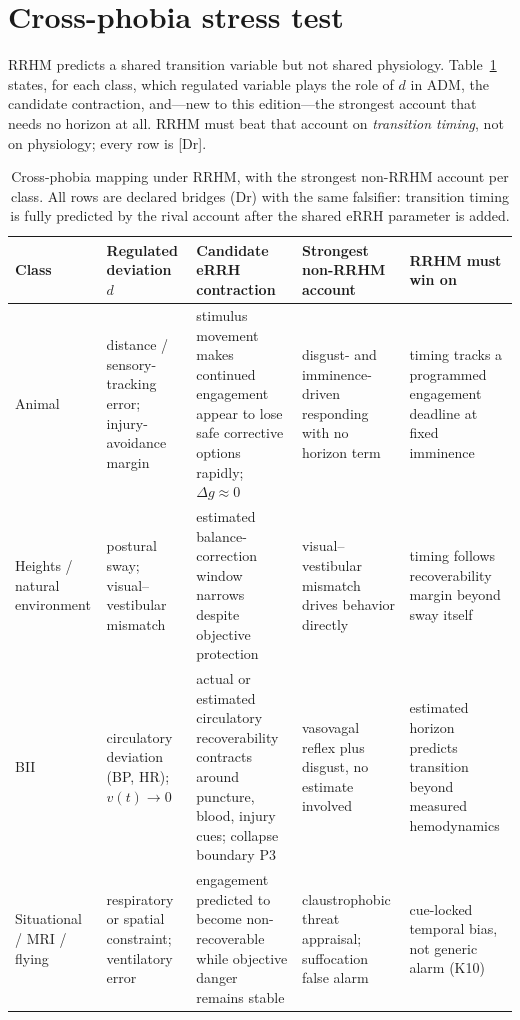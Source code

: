 \documentclass[9pt,twocolumn]{article}
\newcommand{\tier}[1]{{\sffamily\scriptsize\color{RRHMSlate}[#1]}}
\begin{document}
\section{Cross-phobia stress test}
RRHM predicts a shared transition variable but not shared physiology. Table~\ref{tab:cross} states, for each class, which regulated variable plays the role of $d$ in ADM, the candidate contraction, and---new to this edition---the strongest account that needs no horizon at all. RRHM must beat that account on \emph{transition timing}, not on physiology; every row is \tier{Dr}.

\begin{table}[!t]
\centering
\caption{Cross-phobia mapping under RRHM, with the strongest non-RRHM account per class. All rows are declared bridges (Dr) with the same falsifier: transition timing is fully predicted by the rival account after the shared eRRH parameter is added.}
\label{tab:cross}
\small
\begin{tabularx}{\textwidth}{p{}p{}X p{}p{}}
\toprule
\textbf{Class} & \textbf{Regulated deviation $d$} & \textbf{Candidate eRRH contraction} & \textbf{Strongest non-RRHM account} & \textbf{RRHM must win on} \\
\midrule
Animal & distance / sensory-tracking error; injury-avoidance margin & stimulus movement makes continued engagement appear to lose safe corrective options rapidly; $\Delta g\approx0$ & disgust- and imminence-driven responding with no horizon term & timing tracks a programmed engagement deadline at fixed imminence \\
Heights / natural environment & postural sway; visual--vestibular mismatch & estimated balance-correction window narrows despite objective protection & visual--vestibular mismatch drives behavior directly & timing follows recoverability margin beyond sway itself \\
BII & circulatory deviation (BP, HR); $v(t)\to0$ & actual or estimated circulatory recoverability contracts around puncture, blood, injury cues; collapse boundary P3 & vasovagal reflex plus disgust, no estimate involved & estimated horizon predicts transition beyond measured hemodynamics \\
Situational / MRI / flying & respiratory or spatial constraint; ventilatory error & engagement predicted to become non-recoverable while objective danger remains stable & claustrophobic threat appraisal; suffocation false alarm \cite{klein1993} & cue-locked temporal bias, not generic alarm (K10) \\

\end{tabularx}
\end{table}
\end{document}
